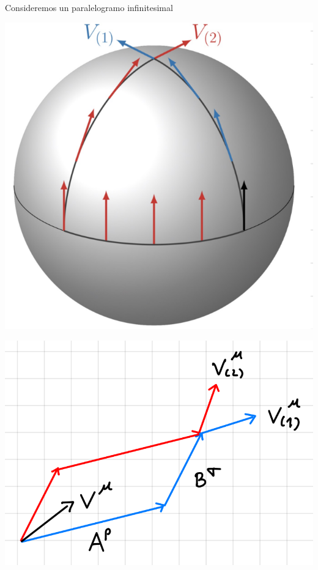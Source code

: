 \documentclass[../main]{subfiles}
\begin{document}
\begin{minipage}{0.5\textwidth}
    Consideremos un paralelogramo infinitesimal 
    \\
    \begin{center}
        \includegraphics[scale=0.4]{img/imgRG4.2.PNG}
    \end{center}
\end{minipage}
\begin{minipage}{0.5\textwidth}
    \begin{center}
        \includegraphics[scale=0.4]{img/imgRG4.3.PNG}
    \end{center}
\end{minipage}
\end{document}
